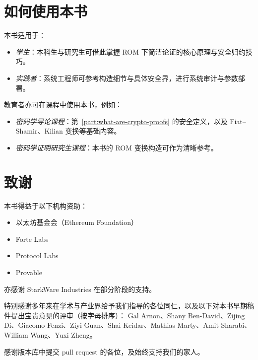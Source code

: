 \documentclass[american,singlepageview]{snargs-book-zh}
\begin{document}
\section[nonumber=true]{如何使用本书}

本书适用于：
\begin{itemize}[noitemsep]
  \item \emph{学生}：本科生与研究生可借此掌握 ROM 下简洁论证的核心原理与安全归约技巧。
  \item \emph{实践者}：系统工程师可参考构造细节与具体安全界，进行系统审计与参数部署。
\end{itemize}
教育者亦可在课程中使用本书，例如：
\begin{itemize}[noitemsep]
  \item \emph{密码学导论课程}：第~\ref{part:what-are-crypto-proofs} 的安全定义，以及 Fiat--Shamir、Kilian 变换等基础内容。
  \item \emph{密码学证明研究生课程}：本书的 ROM 变换构造可作为清晰参考。
\end{itemize}

\section[nonumber=true]{致谢}

本书得益于以下机构资助：
\begin{itemize}[noitemsep]
  \item 以太坊基金会（Ethereum Foundation）
  \item Forte Labs
  \item Protocol Labs
  \item Provable
\end{itemize}
亦感谢 StarkWare Industries 在部分阶段的支持。

特别感谢多年来在学术与产业界给予我们指导的各位同仁，以及以下对本书早期稿件提出宝贵意见的评审（按字母排序）：  
Gal Arnon、Shany Ben-David、Zijing Di、Giacomo Fenzi、Ziyi Guan、Shai Keidar、Mathias Marty、Amit Sharabi、William Wang、Yuxi Zheng。

感谢版本库中提交 pull request 的各位，及始终支持我们的家人。


\mainmatter

\end{document}
